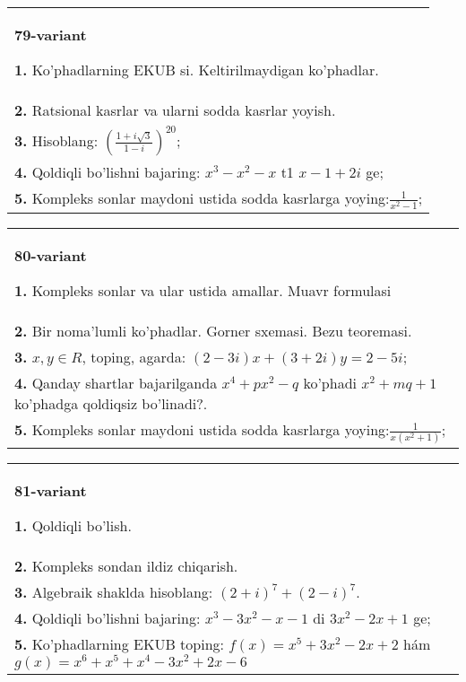 \documentclass{article}
\begin{document}
\begin{tabular}{m{17cm}}
\textbf{79-variant}
\newline

\textbf{1.} Ko’phadlarning EKUB si. Keltirilmaydigan ko’phadlar. \\
\textbf{2.} Ratsional kasrlar va ularni sodda kasrlar yoyish. \\
\textbf{3.} Hisoblang:  $\left(\frac{1+i \sqrt{3}}{1-i}\right)^{20}$; \\
\textbf{4.} Qoldiqli bo’lishni bajaring:  $x^3-x^2-x$ t1 $x-1+2 i$ ge; \\
\textbf{5.} Kompleks sonlar maydoni ustida sodda kasrlarga yoying:$\frac{1}{x^2-1}$; \\

\end{tabular}
\vspace{1cm}


\begin{tabular}{m{17cm}}
\textbf{80-variant}
\newline

\textbf{1.} Kompleks sonlar va ular ustida amallar. Muavr formulasi  \\
\textbf{2.} Bir noma’lumli ko’phadlar. Gorner sxemasi. Bezu teoremasi.  \\
\textbf{3.}  $x, y \in R$, toping, agarda: $(2-3 i) x+(3+2 i) y=2-5 i$; \\
\textbf{4.} Qanday shartlar bajarilganda $x^4+p x^2-q$ ko’phadi $x^2+m q+1$ ko’phadga qoldiqsiz bo’linadi?. \\
\textbf{5.} Kompleks sonlar maydoni ustida sodda kasrlarga yoying:$\frac{1}{x\left(x^2+1\right)}$; \\

\end{tabular}
\vspace{1cm}


\begin{tabular}{m{17cm}}
\textbf{81-variant}
\newline

\textbf{1.} Qoldiqli bo’lish.  \\
\textbf{2.} Kompleks sondan ildiz chiqarish. \\
\textbf{3.} Algebraik shaklda hisoblang: $(2+i)^7+(2-i)^7$. \\
\textbf{4.} Qoldiqli bo’lishni bajaring: $x^3-3 x^2-x-1$ di $3 x^2-2 x+1$ ge; \\
\textbf{5.} Ko’phadlarning EKUB toping:  $f(x)=x^5+3 x^2-2 x+2$ hám $g(x)=x^6+x^5+x^4-3 x^2+2 x-6$ \\

\end{tabular}
\vspace{1cm}
\end{document}
